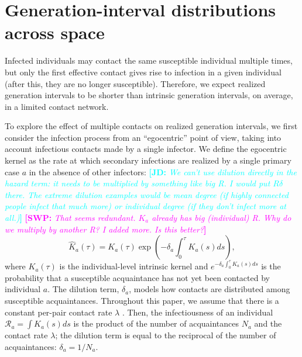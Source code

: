 \documentclass[12pt]{article}
\newcommand{\RR}{\ensuremath{{\mathcal R}}}
\newcommand{\comment}[3]{\textcolor{#1}{\textbf{[#2: }\textsl{#3}\textbf{]}}}
\newcommand{\jd}[1]{\comment{cyan}{JD}{#1}}
\newcommand{\swp}[1]{\comment{magenta}{SWP}{#1}}
\begin{document}

\section{Generation-interval distributions across space}



Infected individuals may contact the same susceptible individual multiple times, but only the first effective contact gives rise to infection in a given individual (after this, they are no longer susceptible).
Therefore, we expect realized generation intervals to be shorter than intrinsic generation intervals, on average, in a limited contact network.

To explore the effect of multiple contacts on realized generation intervals, we first consider the infection process from an ``egocentric'' point of view, taking into account infectious contacts made by a single infector.
We define the egocentric kernel as the rate at which secondary infections are realized by a single primary case $a$ in the absence of other infectors:
\jd{We can't use dilution directly in the hazard term: it needs to be multiplied by something like big R. I would put $R\delta$ there. The extreme dilution examples would be mean degree (if highly connected people infect that much more) or individual degree (if they don't infect more at all.)}
\swp{That seems redundant. $K_a$ already has big (individual) R. Why do we multiply by another R? I added more. Is this better?}
\begin{equation}
\hat{K}_a(\tau) = K_a(\tau) \exp \left(- \delta_a \int_0^\tau K_a(s) ds\right),
\end{equation}
where $K_a(\tau)$ is the individual-level intrinsic kernel and $e^{- \delta_a \int_0^\tau K_a(s) ds}$ is the probability that a susceptible acquaintance has not yet been contacted by individual $a$.
The dilution term, $\delta_a$, models how contacts are distributed among susceptible acquaintances.
Throughout this paper, we assume that there is a constant per-pair contact rate $\lambda$ \citep{trapman2016inferring}.
Then, the infectiousness of an individual $\RR_a = \int K_a(s) ds$ is the product of the number of acquaintances $N_a$ and the contact rate $\lambda$; the dilution term is equal to the reciprocal of the number of acquaintances: $\delta_a = 1/N_a$.
\end{document}
